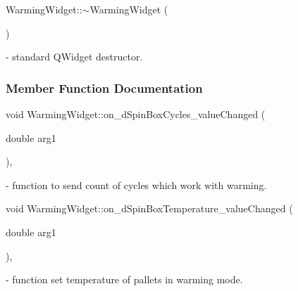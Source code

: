 {\setlength{\rightskip}{0pt plus 5cm}Warming\+Widget\+::{\texorpdfstring{$\sim$\+Warming\+Widget}{~WarmingWidget}} (
\begin{DoxyParamCaption}
{}
\end{DoxyParamCaption}
)}\hypertarget{classWarmingWidget_a17ad9285138404c3dae609b9c8c64912}{}\label{classWarmingWidget_a17ad9285138404c3dae609b9c8c64912} - standard QWidget destructor.


\subsubsection{Member Function Documentation}
{\setlength{\rightskip}{0pt plus 5cm}void Warming\+Widget\+::{\texorpdfstring{on\+\_\+d\+Spin\+Box\+Cycles\+\_\+value\+Changed}{on_dSpinBoxCycles_valueChanged}} (
\begin{DoxyParamCaption}
\item[{double}]{arg1}
\end{DoxyParamCaption}
)\hspace{0.3cm}{\ttfamily [private]}, {\ttfamily [slot]}}\hypertarget{classWarmingWidget_a319141e919d6115a68dd1324464a3d8f}{}\label{classWarmingWidget_a319141e919d6115a68dd1324464a3d8f} - function to send count of cycles which work with warming.  


{\setlength{\rightskip}{0pt plus 5cm}void Warming\+Widget\+::{\texorpdfstring{on\+\_\+d\+Spin\+Box\+Temperature\+\_\+value\+Changed}{on_dSpinBoxTemperature_valueChanged}} (
\begin{DoxyParamCaption}
\item[{double}]{arg1}
\end{DoxyParamCaption}
)\hspace{0.3cm}{\ttfamily [private]}, {\ttfamily [slot]}}\hypertarget{classWarmingWidget_a37d44b7276671774f60932d87a2dcdb5}{}\label{classWarmingWidget_a37d44b7276671774f60932d87a2dcdb5} - function set temperature of pallets in warming mode.


